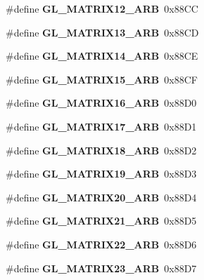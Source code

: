 \begin{DoxyCompactItemize}
\item 
\#define {\bfseries G\+L\+\_\+\+M\+A\+T\+R\+I\+X12\+\_\+\+A\+R\+B}~0x88\+C\+C\label{_s_d_l__opengl_8h_ab3c107e119bc2f67624f3e1b02f3a34e}

\item 
\#define {\bfseries G\+L\+\_\+\+M\+A\+T\+R\+I\+X13\+\_\+\+A\+R\+B}~0x88\+C\+D\label{_s_d_l__opengl_8h_a4f758ad7ec574223a5adc8c5bd2807ec}

\item 
\#define {\bfseries G\+L\+\_\+\+M\+A\+T\+R\+I\+X14\+\_\+\+A\+R\+B}~0x88\+C\+E\label{_s_d_l__opengl_8h_ac0b5e16e244a26912f99a65d4edb5c13}

\item 
\#define {\bfseries G\+L\+\_\+\+M\+A\+T\+R\+I\+X15\+\_\+\+A\+R\+B}~0x88\+C\+F\label{_s_d_l__opengl_8h_a6da09adc9ac51bbab0a14c7846d56992}

\item 
\#define {\bfseries G\+L\+\_\+\+M\+A\+T\+R\+I\+X16\+\_\+\+A\+R\+B}~0x88\+D0\label{_s_d_l__opengl_8h_a381950b3d7a1d8ec6abc2d3fe0229722}

\item 
\#define {\bfseries G\+L\+\_\+\+M\+A\+T\+R\+I\+X17\+\_\+\+A\+R\+B}~0x88\+D1\label{_s_d_l__opengl_8h_a5431ba735f894a8181318afd42698d2a}

\item 
\#define {\bfseries G\+L\+\_\+\+M\+A\+T\+R\+I\+X18\+\_\+\+A\+R\+B}~0x88\+D2\label{_s_d_l__opengl_8h_ae9d347f566d42d4a7552042a4910169f}

\item 
\#define {\bfseries G\+L\+\_\+\+M\+A\+T\+R\+I\+X19\+\_\+\+A\+R\+B}~0x88\+D3\label{_s_d_l__opengl_8h_a89b6cbd127d9ed022da6cd72575ac51c}

\item 
\#define {\bfseries G\+L\+\_\+\+M\+A\+T\+R\+I\+X20\+\_\+\+A\+R\+B}~0x88\+D4\label{_s_d_l__opengl_8h_aa124c3ea6a84df17e6b8cf92ae428068}

\item 
\#define {\bfseries G\+L\+\_\+\+M\+A\+T\+R\+I\+X21\+\_\+\+A\+R\+B}~0x88\+D5\label{_s_d_l__opengl_8h_afef9da61b60774018c7fd025ce2f1feb}

\item 
\#define {\bfseries G\+L\+\_\+\+M\+A\+T\+R\+I\+X22\+\_\+\+A\+R\+B}~0x88\+D6\label{_s_d_l__opengl_8h_a74a53a1aceb6a03c78cff3b642389a2b}

\item 
\#define {\bfseries G\+L\+\_\+\+M\+A\+T\+R\+I\+X23\+\_\+\+A\+R\+B}~0x88\+D7\label{_s_d_l__opengl_8h_afe9d398fddc36679770c52fffd9075cc}


\end{DoxyCompactItemize}
